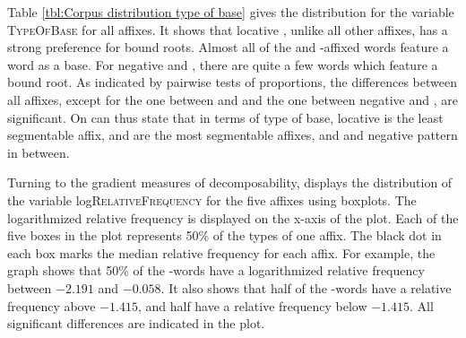 Table \ref{tbl:Corpus distribution type of base} gives the distribution for the variable \textsc{TypeOfBase} for all affixes. It shows that locative , unlike all other affixes, has a strong preference for bound roots. Almost all of the  and -affixed words feature a word as a base. For negative  and , there are quite a few words which feature a bound root. As indicated by pairwise tests of proportions, the differences between all affixes, except for the one between  and  and the one between negative  and , are significant. On can thus state that in terms of type of base, locative  is the least segmentable affix,  and  are the most segmentable affixes, and  and negative  pattern in between.

\begin{table}[H]
	\caption{Type of base by affix}
	\label{tbl:Corpus distribution type of base}
	\begin{center}
\vspace*{-0.2cm}
	\end{center}
\end{table}



Turning to the gradient measures of decomposability,  displays the distribution of the variable log\textsc{RelativeFrequency} 
for the five affixes using boxplots. The logarithmized relative frequency is displayed on the x-axis of the plot.  Each of the five boxes in the plot represents 50\% of the types of one affix.  The black dot in each box marks the median relative frequency for each affix. For example, the graph shows that 50\% of the -words have a logarithmized relative frequency between $-2.191$ and $-0.058$. It also shows that half of the -words have a relative frequency above $-1.415$, and half have a relative frequency below $-1.415$. All significant differences are indicated in the plot.


